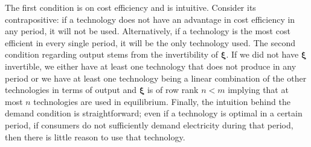 \documentclass[11pt,a4paper,leqno]{extarticle}
\begin{document}
	The first condition is on cost efficiency and is intuitive. Consider its contrapositive: if a technology does not have an advantage in cost efficiency in any period, it will not be used. Alternatively, if a technology is the most cost efficient in every single period, it will be the only technology used. The second condition regarding output stems from the invertibility of $\boldsymbol{\xi}$. If we did not have $\boldsymbol{\xi}$ invertible, we either have at least one technology that does not produce in any period or we have at least one technology being a linear combination of the other technologies in terms of output and $\boldsymbol{\xi}$ is of row rank $n < m$ implying that at most $n$ technologies are used in equilibrium. Finally, the intuition behind the demand condition is straightforward; even if a technology is optimal in a certain period, if consumers do not sufficiently demand electricity during that period, then there is little reason to use that technology. 
	
\end{document}
